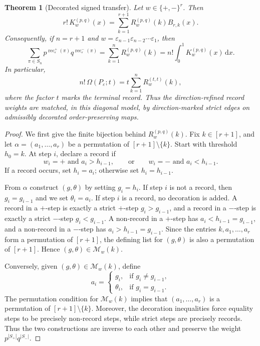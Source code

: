 \documentclass[10pt,a4paper]{amsart}
\newtheorem{theorem}{Theorem}[section]
\DeclareMathOperator{\rec}{rec}
\newcommand{\dd}{\,\mathrm{d}}
\newcommand{\eps}{\varepsilon}
\begin{document}
\begin{theorem}[Decorated signed transfer]
\label{thm:decorated-signed-transfer}
Let \(w\in\{+,-\}^r\).  Then
\[
r!\,K_w^{(p,q)}(x)
=
\sum_{k=1}^{r+1}R_w^{(p,q)}(k)B_{r,k}(x).
\]
Consequently, if \(n=r+1\) and
\(w=\eps_{n-1}\eps_{n-2}\cdots\eps_1\), then
\[
\sum_{\pi\in S_n}
p^{\rec_\eps^+(\pi)}q^{\rec_\eps^-(\pi)}
=
\sum_{k=1}^{n}R_w^{(p,q)}(k)
=
n!\int_0^1K_w^{(p,q)}(x)\dd x.
\]
In particular,
\[
n!\,\Omega(P_\eps;t)
=
t\sum_{k=1}^{n}R_w^{(t,t)}(k),
\]
where the factor \(t\) marks the terminal record.  Thus the
direction-refined record weights are matched, in this diagonal model, by
direction-marked strict edges on admissibly decorated order-preserving maps.
\end{theorem}

\begin{proof}
We first give the finite bijection behind \(R_w^{(p,q)}(k)\).  Fix
\(k\in[r+1]\), and let $\alpha=(a_1,\ldots,a_r)$ be a permutation of \([r+1]\setminus\{k\}\).  Start with threshold
\(h_0=k\).  At step \(i\), declare a record if
\[
w_i=+\text{ and }a_i>h_{i-1},
\qquad\text{or}\qquad
w_i=-\text{ and }a_i<h_{i-1}.
\]
If a record occurs, set \(h_i=a_i\); otherwise set \(h_i=h_{i-1}\).

From \(\alpha\) construct \((g,\theta)\) by setting \(g_i=h_i\).  If step
\(i\) is not a record, then \(g_i=g_{i-1}\) and we set $\theta_i=a_i$. If step \(i\) is a record, no decoration is added.  A record in a \(+\)-step
is exactly a strict \(+\)-step \(g_i>g_{i-1}\), and a record in a \(-\)-step
is exactly a strict \(-\)-step \(g_i<g_{i-1}\).  A non-record in a \(+\)-step
has \(a_i<h_{i-1}=g_{i-1}\), and a non-record in a \(-\)-step has
\(a_i>h_{i-1}=g_{i-1}\).  Since the entries \(k,a_1,\ldots,a_r\) form a
permutation of \([r+1]\), the defining list for \((g,\theta)\) is also a
permutation of \([r+1]\).  Hence \((g,\theta)\in\mathcal M_w(k)\).

Conversely, given \((g,\theta)\in\mathcal M_w(k)\), define
\[
a_i=
\begin{cases}
g_i, & \text{if }g_i\ne g_{i-1},\\
\theta_i, & \text{if }g_i=g_{i-1}.
\end{cases}
\]
The permutation condition for \(\mathcal M_w(k)\) implies that
\((a_1,\ldots,a_r)\) is a permutation of \([r+1]\setminus\{k\}\).
Moreover, the decoration inequalities force equality steps to be precisely
non-record steps, while strict steps are precisely records.  Thus the two
constructions are inverse to each other and preserve the weight
\(p^{|S_+|}q^{|S_-|}\).


\end{proof}
\end{document}
